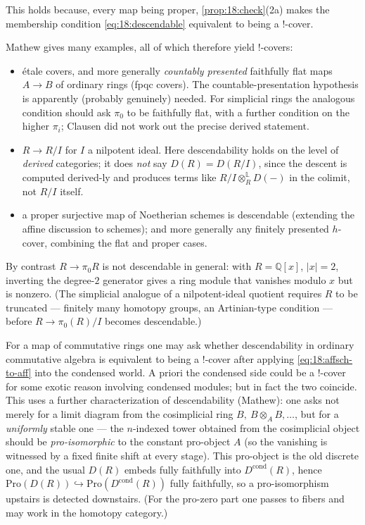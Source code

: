 This holds because, every map being proper, \cref{prop:18:check}(2a) makes the
membership condition \eqref{eq:18:descendable} equivalent to being a $!$-cover.

\begin{example}
\label{ex:18:descendable}
Mathew gives many examples, all of which therefore yield $!$-covers:
\begin{itemize}
\item \'etale covers, and more generally \emph{countably presented} faithfully flat
maps $A\to B$ of ordinary rings (fpqc covers). The countable-presentation
hypothesis is apparently (probably genuinely) needed. For simplicial rings the
analogous condition should ask $\pi_0$ to be faithfully flat, with a further
condition on the higher $\pi_i$; Clausen did not work out the precise derived
statement.
\item $R\to R/I$ for $I$ a nilpotent ideal. Here descendability holds on the level
of \emph{derived} categories; it does \emph{not} say $D(R)=D(R/I)$, since the
descent is computed derived-ly and produces terms like $R/I\otimes^{\mathbb L}_R
D(-)$ in the colimit, not $R/I$ itself.
\item a proper surjective map of Noetherian schemes is descendable (extending the
affine discussion to schemes); and more generally any finitely presented
$h$-cover, combining the flat and proper cases.
\end{itemize}
By contrast $R\to\pi_0 R$ is not descendable in general: with $R=\mathbb{Q}[x]$,
$|x|=2$, inverting the degree-$2$ generator gives a ring module that vanishes
modulo $x$ but is nonzero. (The simplicial analogue of a nilpotent-ideal quotient
requires $R$ to be truncated --- finitely many homotopy groups, an Artinian-type
condition --- before $R\to\pi_0(R)/I$ becomes descendable.)
\end{example}

\begin{remark}
\label{rmk:18:framework-independent}
For a map of commutative rings one may ask whether descendability in ordinary
commutative algebra is equivalent to being a $!$-cover after applying
\eqref{eq:18:affsch-to-aff} into the condensed world. A priori the condensed side
could be a $!$-cover for some exotic reason involving condensed modules; but in fact
the two coincide. This uses a further characterization of descendability (Mathew):
one asks not merely for a limit diagram from the cosimplicial ring
$B,\ B\otimes_A B,\dots$, but for a \emph{uniformly} stable one --- the $n$-indexed
tower obtained from the cosimplicial object should be \emph{pro-isomorphic} to the
constant pro-object $A$ (so the vanishing is witnessed by a fixed finite shift at
every stage). This pro-object is the old discrete one, and the usual $D(R)$ embeds
fully faithfully into $D^{\mathrm{cond}}(R)$, hence
$\mathrm{Pro}(D(R))\hookrightarrow\mathrm{Pro}(D^{\mathrm{cond}}(R))$ fully
faithfully, so a pro-isomorphism upstairs is detected downstairs. (For the
pro-zero part one passes to fibers and may work in the homotopy category.)
\end{remark}

